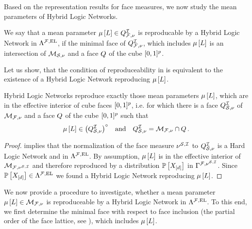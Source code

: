 \label{sec:HLNrepMean} %

Based on the representation results for face measures, we now study the mean parameters of Hybrid Logic Networks.

\begin{definition}\label{def:HLNrepMean}
    We say that a mean parameter $\mu\left[L\right]\in Q^{\mathcal{I}}_{\mathcal{F},\nu}$ is reproducable by a Hybrid Logic Network in $\Lambda^{\mathcal{F},\mathrm{EL}}$, if the minimal face of $Q^{\mathcal{I}}_{\mathcal{F},\nu}$, which includes $\mu\left[L\right]$ is an intersection of $\mathcal{M}_{\mathcal{S},\nu}$ and a face $Q$ of the cube $[0,1]^{p}$.
\end{definition}

Let us show, that the condition of reproduceability in  is equivalent to the existence of a Hybrid Logic Network reproducing $\mu\left[L\right]$.

\begin{theorem}
    \label{the:hlnInteriorCharacterization}
    Hybrid Logic Networks reproduce exactly those mean parameters $\mu\left[L\right]$, which are in the effective interior of cube faces $[0,1]^{p}$, i.e. for which there is a face $Q^{\mathcal{I}}_{\mathcal{S},\nu}$ of $\mathcal{M}_{\mathcal{F},\nu}$ and a face $Q$ of the cube $[0,1]^{p}$ such that
    \begin{align*}
        \mu\left[L\right]\in{\left(Q^{\mathcal{I}}_{\mathcal{S},\nu}\right)}^{\circ} \quad\text{and}\quad Q^{\mathcal{I}}_{\mathcal{S},\nu} = \mathcal{M}_{\mathcal{F},\nu}\cap Q \, .
    \end{align*}
\end{theorem}
\begin{proof}
     implies that the normalization of the face measure $\nu^{\mathcal{S},\mathcal{I}}$ to $Q^{\mathcal{I}}_{\mathcal{S},\nu}$ is a Hard Logic Network and in $\Lambda^{\mathcal{F},\mathrm{EL}}$.
    By assumption, $\mu\left[L\right]$ is in the effective interior of $\mathcal{M}_{\mathcal{F},\nu^{\mathcal{S},\mathcal{I}}}$ and therefore reproduced by a distribution $\mathbb{P}\left[X_{[d]}\right]$ in $\Gamma^{\mathcal{F},\nu^{\mathcal{S},\mathcal{I}}}$.
    Since $\mathbb{P}\left[X_{[d]}\right]\in\Lambda^{\mathcal{F},\mathrm{EL}}$ we found a Hybrid Logic Network reproducing $\mu\left[L\right]$.
\end{proof}

We now provide a procedure to investigate, whether a mean parameter $\mu\left[L\right]\in\mathcal{M}_{\mathcal{F},\nu}$ is reproduceable by a Hybrid Logic Network in $\Lambda^{\mathcal{F},\mathrm{EL}}$.
To this end, we first determine the minimal face with respect to face inclusion (the partial order of the face lattice, see \cite{ziegler_lectures_2013}), which includes $\mu\left[L\right]$.

